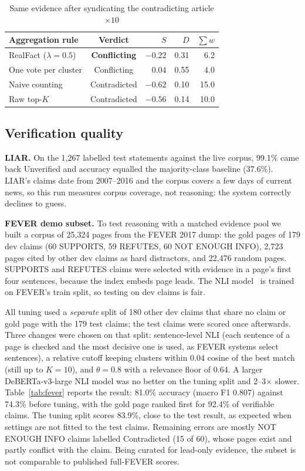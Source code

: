 \documentclass[conference,a4paper]{IEEEtran}
\begin{document}
\begin{table}[!t]
\caption{Same evidence after syndicating the contradicting article $\times10$}
\label{tab:case}
\centering\footnotesize
\setlength{\tabcolsep}{3pt}
\begin{tabular}{lcrrr}
\toprule
\textbf{Aggregation rule} & \textbf{Verdict} & $S$ & $D$ & $\sum w$\\
\midrule
\rowcolor{novelsoft}RealFact ($\lambda=0.5$) & \textcolor{conf}{\textbf{Conflicting}} & $-0.22$ & 0.31 & 6.2\\
One vote per cluster & \textcolor{conf}{Conflicting} & $0.04$ & 0.55 & 4.0\\
Naive counting & \textcolor{con}{Contradicted} & $-0.62$ & 0.10 & 15.0\\
Raw top-$K$ & \textcolor{con}{Contradicted} & $-0.56$ & 0.14 & 10.0\\
\bottomrule
\end{tabular}
\end{table}

\subsection{Verification quality}
\label{sec:fever}
\textbf{LIAR.} On the 1,267 labelled test statements against the live corpus, 99.1\% came back Unverified and accuracy
equalled the majority-class baseline (37.6\%). LIAR's claims date from 2007--2016 and the corpus covers a few days of
current news, so this run measures corpus coverage, not reasoning: the system correctly declines to guess.

\textbf{FEVER demo subset.} To test reasoning with a matched evidence pool we built a corpus of 25,324 pages from the
FEVER 2017 dump: the gold pages of 179 dev claims (60 SUPPORTS, 59 REFUTES, 60 NOT ENOUGH INFO), 2,723 pages cited by
other dev claims as hard distractors, and 22,476 random pages. SUPPORTS and REFUTES claims were selected with evidence
in a page's first four sentences, because the index embeds page leads. The NLI model~\cite{laurer} is trained on
FEVER's train split, so testing on dev claims is fair.

All tuning used a \emph{separate} split of 180 other dev claims that share no claim or gold page with the 179 test
claims; the test claims were scored once afterwards. Three changes were chosen on that split: sentence-level NLI
(each sentence of a page is checked and the most decisive one is used, as FEVER systems select sentences), a relative
cutoff keeping clusters within 0.04 cosine of the best match (still up to $K=10$), and $\theta=0.8$ with a relevance
floor of 0.64. A larger DeBERTa-v3-large NLI model was no better on the tuning split and 2--3$\times$ slower.
Table~\ref{tab:fever} reports the result: 81.0\% accuracy (macro F1 0.807) against 74.3\% before tuning, with the
gold page ranked first for 92.4\% of verifiable claims. The tuning split scores 83.9\%, close to the test result, as
expected when settings are not fitted to the test claims. Remaining errors are mostly NOT ENOUGH INFO claims labelled
Contradicted (15 of 60), whose pages exist and partly conflict with the claim. Being curated for lead-only evidence,
the subset is not comparable to published full-FEVER scores.
\end{document}
